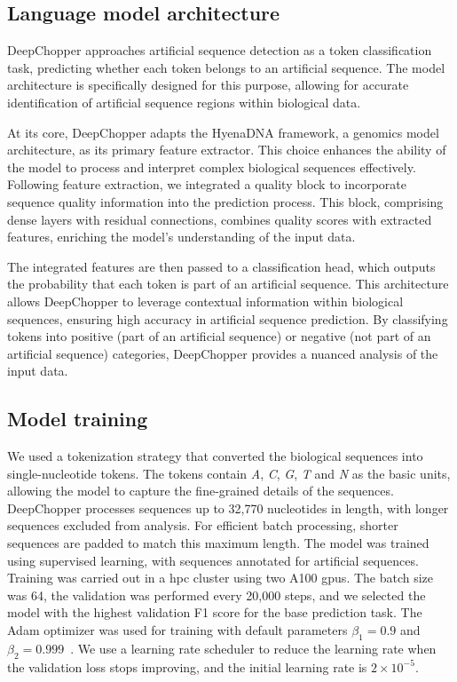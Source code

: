 \documentclass[pdflatex,sn-nature, lineno]{sn-jnl}%
\theoremstyle{thmstyleone}%
\theoremstyle{thmstyletwo}%
\theoremstyle{thmstylethree}%
\begin{document}
\subsection{Language model architecture}\label{ssec:lm}

DeepChopper approaches artificial sequence detection as a token classification task, predicting whether each token belongs to an artificial sequence.
The model architecture is specifically designed for this purpose, allowing for accurate identification of artificial sequence regions within biological data.

At its core, DeepChopper adapts the HyenaDNA framework, a genomics model architecture, as its primary feature extractor.
This choice enhances the ability of the model to process and interpret complex biological sequences effectively.
Following feature extraction, we integrated a quality block to incorporate sequence quality information into the prediction process.
This block, comprising dense layers with residual connections, combines quality scores with extracted features, enriching the model's understanding of the input data.

The integrated features are then passed to a classification head, which outputs the probability that each token is part of an artificial sequence.
This architecture allows DeepChopper to leverage contextual information within biological sequences, ensuring high accuracy in artificial sequence prediction.
By classifying tokens into positive (part of an artificial sequence) or negative (not part of an artificial sequence) categories, DeepChopper provides a nuanced analysis of the input data.


\subsection{Model training}\label{ssec:training}

We used a tokenization strategy that converted the biological sequences into single-nucleotide tokens.
The tokens contain \emph{A}, \emph{C}, \emph{G}, \emph{T} and \emph{N} as the basic units, allowing the model to capture the fine-grained details of the sequences.
DeepChopper processes sequences up to 32,770 nucleotides in length, with longer sequences excluded from analysis.
For efficient batch processing, shorter sequences are padded to match this maximum length.
The model was trained using supervised learning, with sequences annotated for artificial sequences.
Training was carried out in a \gls{hpc} cluster using two A100 \glspl{gpu}.
The batch size was 64, the validation was performed every 20,000 steps, and we selected the model with the highest validation F1 score for the base prediction task.
The Adam optimizer was used for training with default parameters \( \beta_{1} = 0.9 \) and \( \beta_{2} = 0.999 \)~\cite{kingma2014adam}.
We use a learning rate scheduler to reduce the learning rate when the validation loss stops improving, and the initial learning rate is \( 2 \times 10^{-5} \).
\end{document}
